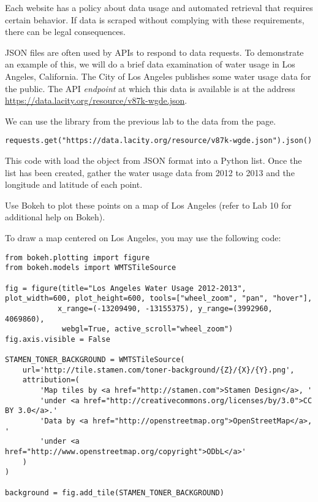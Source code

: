 \begin{warn}
Each website has a policy about data usage and automated retrieval that requires certain behavior.
If data is scraped without complying with these requirements, there can be legal consequences.
\end{warn}

\begin{problem}
JSON files are often used by APIs to respond to data requests.
To demonstrate an example of this, we will do a brief data examination of water usage in Los Angeles, California.
The City of Los Angeles publishes some water usage data for the public.
The API \emph{endpoint} at which this data is available is at the address \url{https://data.lacity.org/resource/v87k-wgde.json}.

We can use the  library from the previous lab to  the data from the page.

\begin{lstlisting}
requests.get("https://data.lacity.org/resource/v87k-wgde.json").json()
\end{lstlisting}

This code with load the object from JSON format into a Python list.
Once the list has been created, gather the water usage data from 2012 to 2013 and the longitude and latitude of each point.

Use Bokeh to plot these points on a map of Los Angeles (refer to Lab 10 for additional help on Bokeh).

To draw a map centered on Los Angeles, you may use the following code:
\begin{lstlisting}
from bokeh.plotting import figure
from bokeh.models import WMTSTileSource

fig = figure(title="Los Angeles Water Usage 2012-2013", plot_width=600, plot_height=600, tools=["wheel_zoom", "pan", "hover"],
            x_range=(-13209490, -13155375), y_range=(3992960, 4069860),
             webgl=True, active_scroll="wheel_zoom")
fig.axis.visible = False

STAMEN_TONER_BACKGROUND = WMTSTileSource(
    url='http://tile.stamen.com/toner-background/{Z}/{X}/{Y}.png',
    attribution=(
        'Map tiles by <a href="http://stamen.com">Stamen Design</a>, '
        'under <a href="http://creativecommons.org/licenses/by/3.0">CC BY 3.0</a>.'
        'Data by <a href="http://openstreetmap.org">OpenStreetMap</a>, '
        'under <a href="http://www.openstreetmap.org/copyright">ODbL</a>'
    )
)

background = fig.add_tile(STAMEN_TONER_BACKGROUND)
\end{lstlisting}


\end{problem}
